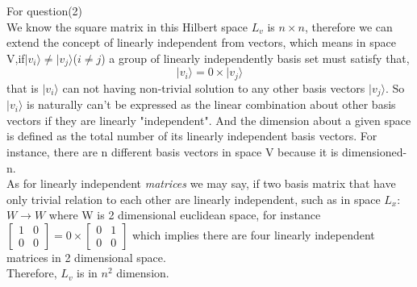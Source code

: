 For question(2)\\
We know the square matrix in this Hilbert space $L_v$ is $n\times n$, therefore we can extend the concept of linearly independent from vectors, which means in space V,if$|v_i\rangle \neq |v_j\rangle$($i\neq j$) a group of linearly independently basis set must satisfy that, 
\begin{equation}
|v_i\rangle = 0\times|v_j\rangle
\end{equation}
that is $|v_i\rangle$ can not having non-trivial solution to any other basis vectors $|v_j\rangle$. So $|v_i\rangle$ is naturally can't be expressed as the linear combination about other basis vectors if they are linearly "independent". And the dimension about a given space is defined as the total number of its linearly independent basis vectors. For instance, there are n different basis vectors in space V because it is dimensioned-n.\\
As for linearly independent \emph{matrices} we may say, if two basis matrix that have only trivial relation to each other are linearly independent, such as in space $L_x$: $W\rightarrow W$ where W is 2 dimensional euclidean space, for instance
$\left[\begin{array}{ll}1 & 0 \\ 0 & 0\end{array}\right] = 0\times\left[\begin{array}{ll}0 & 1 \\ 0 & 0\end{array}\right]$ which implies there are four linearly independent matrices in 2 dimensional space.\\
Therefore, $L_v$ is in $n^2$ dimension.

